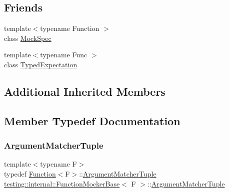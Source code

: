 \subsection*{Friends}
\begin{DoxyCompactItemize}
\item 
{\footnotesize template$<$typename Function $>$ }\\class \hyperlink{classtesting_1_1internal_1_1_function_mocker_base_ae72aeee91c93e8ae5e1ed7f726a766b2}{Mock\+Spec}
\item 
{\footnotesize template$<$typename Func $>$ }\\class \hyperlink{classtesting_1_1internal_1_1_function_mocker_base_a4f17de55396a8ef740d5ad2b1380a851}{Typed\+Expectation}
\end{DoxyCompactItemize}
\subsection*{Additional Inherited Members}


\subsection{Member Typedef Documentation}
\mbox{\label{classtesting_1_1internal_1_1_function_mocker_base_ab790bcb1dcf57fa6659365386723ae5a}} 
\subsubsection{\texorpdfstring{Argument\+Matcher\+Tuple}{ArgumentMatcherTuple}}
{\footnotesize\ttfamily template$<$typename F$>$ \\
typedef \hyperlink{structtesting_1_1internal_1_1_function}{Function}$<$F$>$\+::\hyperlink{classtesting_1_1internal_1_1_function_mocker_base_ab790bcb1dcf57fa6659365386723ae5a}{Argument\+Matcher\+Tuple} \hyperlink{classtesting_1_1internal_1_1_function_mocker_base}{testing\+::internal\+::\+Function\+Mocker\+Base}$<$ F $>$\+::\hyperlink{classtesting_1_1internal_1_1_function_mocker_base_ab790bcb1dcf57fa6659365386723ae5a}{Argument\+Matcher\+Tuple}}

